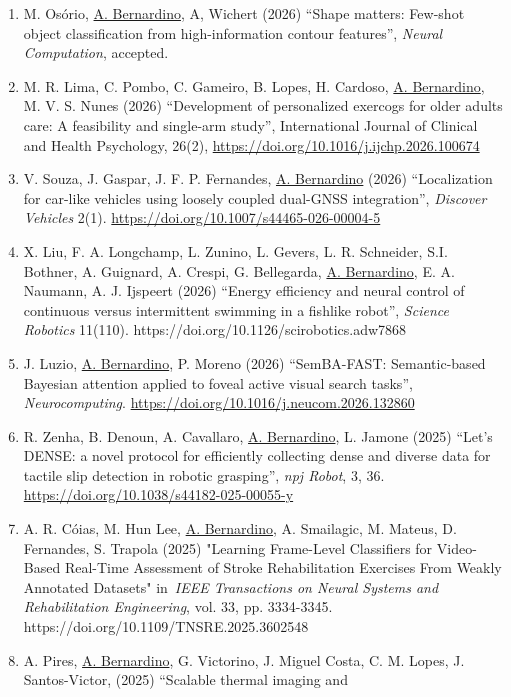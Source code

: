\documentclass[
]{article}
\begin{document}
\begin{enumerate}
\def\labelenumi{\arabic{enumi}.}
\item
  M. Osório, \ul{A. Bernardino}, A, Wichert (2026) ``Shape matters:
  Few-shot object classification from high-information contour
  features'', \emph{Neural Computation}, accepted.
\item
  M. R. Lima, C. Pombo, C. Gameiro, B. Lopes, H. Cardoso, \ul{A.
  Bernardino}, M. V. S. Nunes (2026) ``Development of personalized
  exercogs for older adults care: A feasibility and single-arm study'',
  International Journal of Clinical and Health Psychology, 26(2),
  \url{https://doi.org/10.1016/j.ijchp.2026.100674}
\item
  V. Souza, J. Gaspar, J. F. P. Fernandes, \ul{A. Bernardino} (2026)
  ``Localization for car-like vehicles using loosely coupled dual-GNSS
  integration'', \emph{Discover Vehicles} 2(1).
  \url{https://doi.org/10.1007/s44465-026-00004-5}
\item
  X. Liu, F. A. Longchamp, L. Zunino, L. Gevers, L. R. Schneider, S.I.
  Bothner, A. Guignard, A. Crespi, G. Bellegarda, \ul{A. Bernardino}, E.
  A. Naumann, A. J. Ijspeert (2026) ``Energy efficiency and neural
  control of continuous versus intermittent swimming in a fishlike
  robot'', \emph{Science Robotics} 11(110).
  https://doi.org/10.1126/scirobotics.adw7868
\item
  J. Luzio, \ul{A. Bernardino}, P. Moreno (2026) ``SemBA-FAST:
  Semantic-based Bayesian attention applied to foveal active visual
  search tasks'', \emph{Neurocomputing}.
  \url{https://doi.org/10.1016/j.neucom.2026.132860}
\item
  R. Zenha, B. Denoun, A. Cavallaro, \ul{A. Bernardino}, L. Jamone
  (2025) ``Let's DENSE: a novel protocol for efficiently collecting
  dense and diverse data for tactile slip detection in robotic
  grasping'', \emph{npj Robot}, 3, 36.
  \url{https://doi.org/10.1038/s44182-025-00055-y}
\item
  A. R. Cóias, M. Hun Lee, \ul{A. Bernardino}, A. Smailagic, M. Mateus,
  D. Fernandes, S. Trapola (2025) "Learning Frame-Level Classifiers for
  Video-Based Real-Time Assessment of Stroke Rehabilitation Exercises
  From Weakly Annotated Datasets" in~\emph{IEEE Transactions on Neural
  Systems and Rehabilitation Engineering}, vol. 33, pp. 3334-3345.
  https://doi.org/10.1109/TNSRE.2025.3602548
\item
  A. Pires, \ul{A. Bernardino}, G. Victorino, J. Miguel Costa, C. M.
  Lopes, J. Santos-Victor, (2025) ``Scalable thermal imaging and

\end{enumerate}
\end{document}
